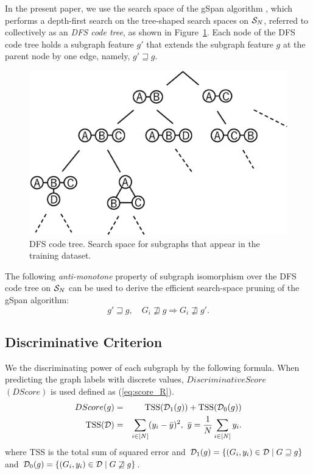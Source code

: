 In the present paper, we use the search space of the gSpan algorithm \cite{Yan:2002},
which performs a depth-first search on the tree-shaped search spaces on $\S_N$,
referred to collectively as an \textit{DFS code tree}, as shown in Figure~\ref{fig:search_tree}.
Each node of the DFS code tree holds a subgraph feature $g'$ that
extends the subgraph feature $g$ at the parent node by one edge, namely, $ g' \sqsupseteq g $.

\begin{figure}[t]
  \centering
  \includegraphics[width=0.5\linewidth]{img/search_tree.eps}
  \caption{DFS code tree. Search space for subgraphs that appear in the training dataset.}
  \label{fig:search_tree}
\end{figure}

The following \textit{anti-monotone} property of
subgraph isomorphism over the DFS code tree on $\S_N$ can be used to
derive the efficient search-space pruning of the gSpan algorithm:
\begin{equation}
  \label{eq:propSubgraph}
  g' \sqsupseteq g, \quad 
  G_i \not \sqsupseteq g \Rightarrow G_i \not\sqsupseteq g'. %
\end{equation}

\subsection{Discriminative Criterion}
\label{sec:criterion}
We the discriminating power of each subgraph by the following formula.
When predicting the graph labels with discrete values, $Discriminative Score$ $(DScore)$  is used defined as (\ref{eq:score_R}).
\begin{eqnarray}
  \label{eq:score_R}
  DScore(g) &=& \tss(\D_1(g)) + \tss(\D_0(g)) \\
  \tss(\D) &=& \sum_{i \in [N]}
  (y_i - \bar{y})^2, \,\, \bar{y} = \frac{1}{N} \sum_{i \in [N]} y_i. \nonumber
\end{eqnarray}
where TSS is the total sum of squared error and
$\D_1(g) = \{ (G_i, y_i) \in \D \mid G \sqsupseteq g \} $ and
$\D_0(g) = \{ (G_i, y_i) \in \D \mid G \not\sqsupseteq g \} $.

